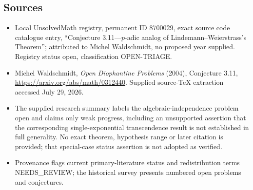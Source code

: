 \documentclass[11pt]{article}
\begin{document}
\subsection{Sources}
\begin{itemize}
\item Local UnsolvedMath registry, permanent ID 8700029, exact source code catalogue entry, ``Conjecture 3.11---$p$-adic analog of Lindemann--Weierstrass's Theorem''; attributed to Michel Waldschmidt, no proposed year supplied. Registry status open, classification OPEN-TRIAGE.
\item Michel Waldschmidt, \emph{Open Diophantine Problems} (2004), Conjecture 3.11, \url{https://arxiv.org/abs/math/0312440}. Supplied source-TeX extraction accessed July 29, 2026.
\item The supplied research summary labels the algebraic-independence problem open and claims only weak progress, including an unsupported assertion that the corresponding single-exponential transcendence result is not established in full generality. No exact theorem, hypothesis range or later citation is provided; that special-case status assertion is not adopted as verified.
\item Provenance flags current primary-literature status and redistribution terms NEEDS\_REVIEW; the historical survey presents numbered open problems and conjectures.
\end{itemize}
\end{document}

